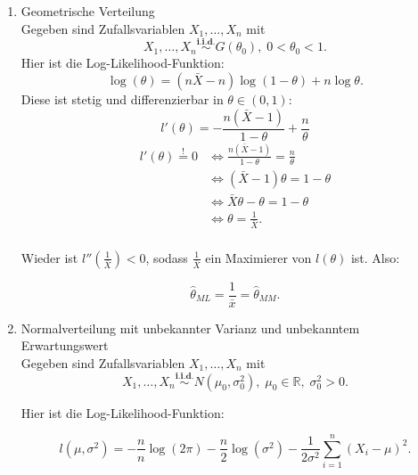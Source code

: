 \documentclass[10pt]{article}
\newcommand{\FZV}{X_1, \ldots, X_n} %
\newcommand{\IR}{\mathbb{R}} %
\newenvironment{BSP}[1][]
{\begin{Beispiel}[frametitle=#1]}{\end{Beispiel}}
\begin{document}
\begin{BSP}[Beispiel 1.3.8 (Maximum-Likelihood)]
\begin{enumerate}[label = (\roman*)]
			
			\item Geometrische Verteilung \\
			Gegeben sind Zufallsvariablen $\FZV$ mit
			\begin{equation*}
				\FZV \overset{\textbf{i.i.d.}}{\sim} G(\theta_0), \; 0 < \theta_0 < 1.
			\end{equation*} 
			Hier ist die Log-Likelihood-Funktion: 
			\begin{equation*}
				\log(\theta)= (n\bar{X}-n)\log(1-\theta)+ n\log\theta.
			\end{equation*}
			Diese ist stetig und differenzierbar in $\theta \in (0,1)$:
			\begin{equation*}
				l'(\theta) = - \frac{n(\bar{X}-1)}{1-\theta} + \frac{n}{\theta}
			\end{equation*}
			\begin{equation*}
				\begin{split}
					l'(\theta) \overset{!}{=} 0 &\Leftrightarrow \frac{n (\bar{X}-1)}{1-\theta} = \frac{n}{\theta}\\
					&\Leftrightarrow (\bar{X}-1) \theta = 1-\theta\\
					&\Leftrightarrow \bar{X} \theta - \theta = 1-\theta\\
					&\Leftrightarrow \theta = \frac{1}{\bar{X}}.\\
				\end{split}
			\end{equation*}
			
			Wieder ist $l''(\frac{1}{\bar{X}}) <0$, sodass $\frac{1}{\bar{X}}$ ein Maximierer von $l(\theta)$ ist. Also:
			
			\begin{equation*}
				\hat{\theta}_{ML} = \frac{1}{\bar{x}} = \hat{\theta}_{MM}.
			\end{equation*} 
			
			\item Normalverteilung mit unbekannter Varianz und unbekanntem Erwartungswert\\
			Gegeben sind Zufallsvariablen $\FZV$ mit
			\begin{equation*}
				\FZV \overset{\textbf{i.i.d.}} {\sim} N(\mu_0,\sigma_0^2),\; \mu_0 \in \IR, \; \sigma_0^2 >0. 
			\end{equation*}
			
			Hier ist die Log-Likelihood-Funktion:
			
			\begin{equation*}
				l(\mu, \sigma^2) = -\frac{n}{n}\log(2\pi) - \frac{n}{2}\log(\sigma^2)-\frac{1}{2\sigma^2}\sum_{i=1}^{n}(X_i-\mu)^2.
			\end{equation*}
			

\end{enumerate}
\end{BSP}
\end{document}

